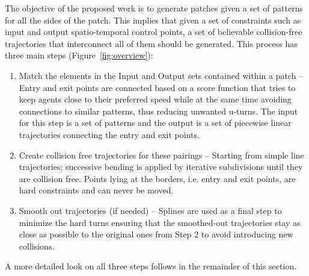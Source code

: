The objective of the proposed work is to generate patches given a set of patterns for all the sides of the patch.
This implies that given a set of constraints such as input and output spatio-temporal control points, a set of believable collision-free trajectories that interconnect all of them should be generated.
This process has three main steps (Figure~\ref{fig:overview}):
\begin{enumerate}
  \item Match the elements in the Input and Output sets contained within a patch {--}
  Entry and exit points are connected based on a score function that tries to keep agents close to their preferred speed while at the same time avoiding connections to similar patterns, thus reducing unwanted u-turns.
  The input for this step is a set of patterns and the output is a set of piecewise linear trajectories connecting the entry and exit points.
  \item Create collision free trajectories for these pairings {--}
  Starting from simple line trajectories; successive bending is applied by iterative subdivisions until they are collision free.
  Points lying at the borders, i.e. entry and exit points, are hard constraints and can never be moved.
  \item Smooth out trajectories (if needed) {--}
   Splines are used as a final step to minimize the hard turns ensuring that the smoothed-out trajectories stay as close as possible to the original ones from Step $2$ to avoid introducing new collisions.
\end{enumerate}

% 
% 
%       

A more detailed look on all three steps follows in the remainder of this section.


